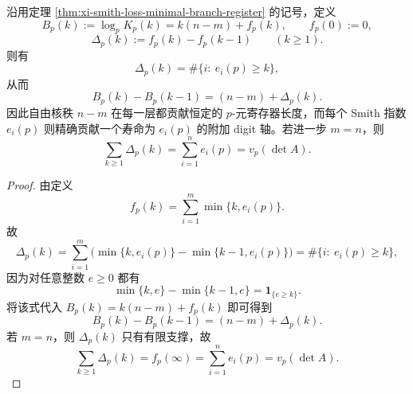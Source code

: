 \begin{corollary}\label{cor:xi-smith-index-layer-lifetime-register}
沿用定理 \ref{thm:xi-smith-loss-minimal-branch-register} 的记号，定义
\[
B_p(k):=\log_p K_p(k)=k(n-m)+f_p(k),
\qquad
f_p(0):=0,
\]
\[
\Delta_p(k):=f_p(k)-f_p(k-1)
\qquad(k\ge 1).
\]
则有
\[
\Delta_p(k)=\#\{i:\ e_i(p)\ge k\},
\]
从而
\[
B_p(k)-B_p(k-1)=(n-m)+\Delta_p(k).
\]
因此自由核秩 \(n-m\) 在每一层都贡献恒定的 \(p\)-元寄存器长度，而每个 Smith 指数 \(e_i(p)\) 则精确贡献一个寿命为 \(e_i(p)\) 的附加 digit 轴。若进一步 \(m=n\)，则
\[
\sum_{k\ge 1}\Delta_p(k)=\sum_{i=1}^{n}e_i(p)=v_p(\det A).
\]
\end{corollary}
\begin{proof}
由定义
\[
f_p(k)=\sum_{i=1}^{m}\min\{k,e_i(p)\}.
\]
故
\[
\Delta_p(k)
=\sum_{i=1}^{m}\bigl(\min\{k,e_i(p)\}-\min\{k-1,e_i(p)\}\bigr)
=\#\{i:\ e_i(p)\ge k\},
\]
因为对任意整数 \(e\ge 0\) 都有
\[
\min\{k,e\}-\min\{k-1,e\}=\mathbf 1_{\{e\ge k\}}.
\]
将该式代入
\(
B_p(k)=k(n-m)+f_p(k)
\)
即可得到
\[
B_p(k)-B_p(k-1)=(n-m)+\Delta_p(k).
\]
若 \(m=n\)，则 \(\Delta_p(k)\) 只有有限支撑，故
\[
\sum_{k\ge 1}\Delta_p(k)=f_p(\infty)=\sum_{i=1}^{n}e_i(p)=v_p(\det A).
\]
\end{proof}

